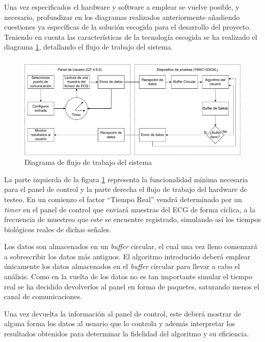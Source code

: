         Una vez especificados el hardware y software a emplear se vuelve posible, y necesario, profundizar en los diagramas realizados anteriormente añadiendo cuestiones ya específicas de la solución escogida para el desarrollo del proyecto. Teniendo en cuenta las características de la tecnología escogida se ha realizado el diagrama \ref{fig:InternalBlocksDiagram}, detallando el flujo de trabajo del sistema.

        \begin{figure}[H]  
            \centering
                \includegraphics[width =\linewidth]{figuras/InternBlockDiagram.pdf}
                \caption{Diagrama de flujo de trabajo del sistema}
                \label{fig:InternalBlocksDiagram}
        \end{figure}
 
        La parte izquierda de la figura \ref{fig:InternalBlocksDiagram} representa la funcionalidad mínima necesaria para el panel de control y la parte derecha el flujo de trabajo del hardware de testeo. En un comienzo el factor ``Tiempo Real'' vendrá determinado por un \textit{timer} en el panel de control que enviará muestras del ECG de forma cíclica, a la frecuencia de muestreo que este se encuentre registrado, simulando así los tiempos biológicos reales de dichas señales. 
        
        Los datos son almacenados en un \textit{buffer} circular, el cual una vez lleno comenzará a sobrescribir los datos más antiguos. El algoritmo introducido deberá emplear únicamente los datos almacenados en el \textit{buffer} circular para llevar a cabo el análisis. Como en la vuelta de los datos no es tan importante simular el tiempo real se ha decidido devolverlos al panel en forma de paquetes, saturando menos el canal de comunicaciones.
        
        Una vez devuelta la información al panel de control, este deberá mostrar de alguna forma los datos al usuario que lo controla y además interpretar los resultados obtenidos para determinar la fidelidad del algoritmo y su eficiencia.        

